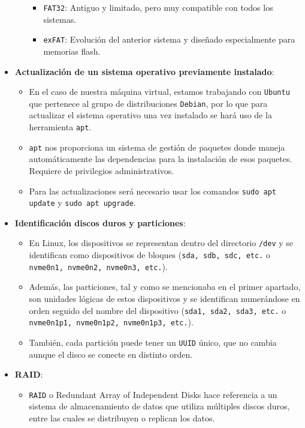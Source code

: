 \documentclass[10pt]{article}
\begin{document}
\begin{itemize}
\begin{itemize}
\begin{itemize}
				\item \verb|FAT32|: Antiguo y limitado, pero muy compatible con todos los sistemas.
				\item \verb|exFAT|: Evolución del anterior sistema y diseñado especialmente para memorias flash.
			\end{itemize}
		\end{itemize}
		\item \textbf{Actualización de un sistema operativo previamente instalado}:
		\begin{itemize}
			\item En el caso de nuestra máquina virtual, estamos trabajando con \verb|Ubuntu| que pertenece al grupo de distribuciones \verb|Debian|, por lo que para actualizar el sistema operativo una vez instalado se hará uso de la herramienta \verb|apt|.
			\item \verb|apt| nos proporciona un sistema de gestión de paquetes donde maneja automáticamente las dependencias para la instalación de esos paquetes. Requiere de privilegios administrativos.\cite{Actualizar}
			\item Para las actualizaciones será necesario usar los comandos \verb|sudo apt update| y \verb|sudo apt upgrade|.
		\end{itemize}
		\item \textbf{Identificación discos duros y particiones}:
		\begin{itemize}
			\item En Linux, los dispositivos se representan dentro del directorio \verb|/dev| y se identifican como dispositivos de bloques (\verb|sda, sdb, sdc, etc.| o \verb|nvme0n1, nvme0n2, nvme0n3, etc.|).
			\item Además, las particiones, tal y como se mencionaba en el primer apartado, son unidades lógicas de estos dispositivos y se identifican numerándose en orden seguido del nombre del dispositivo (\verb|sda1, sda2, sda3, etc.| o \verb|nvme0n1p1, nvme0n1p2, nvme0n1p3, etc.|).\cite{Discos}
			\item También, cada partición puede tener un \verb|UUID| único, que no cambia aunque el disco se conecte en distinto orden.
		\end{itemize}
		\item \textbf{RAID}: 
		\begin{itemize}
			\item \verb|RAID| o Redundant Array of Independent Disks hace referencia a un sistema de almacenamiento de datos que utiliza múltiples discos duros, entre las cuales se distribuyen o replican los datos. \cite{RAID}

\end{itemize}
\end{itemize}
\end{document}
